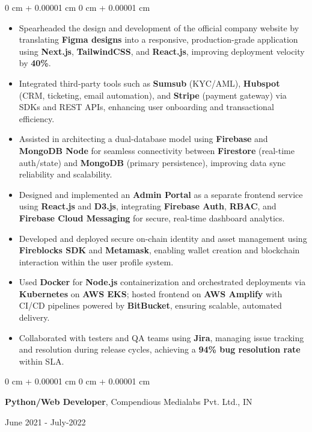 \documentclass[10pt, letterpaper]{article}
\newenvironment{highlights}{
    \begin{itemize}[
        topsep=0.10 cm,
        parsep=0.10 cm,
        partopsep=0pt,
        itemsep=0pt,
        leftmargin=0 cm + 10pt
    ]
}{
    \end{itemize}
} %
\newenvironment{onecolentry}{
    \begin{adjustwidth}{
        0 cm + 0.00001 cm
    }{
        0 cm + 0.00001 cm
    }
}{
    \end{adjustwidth}
} %
\newenvironment{twocolentry}[2][]{
    \onecolentry
    \def\secondColumn{#2}
    \setcolumnwidth{\fill, 4.5 cm}
    \begin{paracol}{2}
}{
    \switchcolumn \raggedleft \secondColumn
    \end{paracol}
    \endonecolentry
} %
\begin{document}
\begin{onecolentry}
\begin{highlights}
	\item Spearheaded the design and development of the official company website by translating \textbf{Figma designs} into a responsive, production-grade application using \textbf{Next.js}, \textbf{TailwindCSS}, and \textbf{React.js}, improving deployment velocity by \textbf{40\%}.
	\item Integrated third-party tools such as \textbf{Sumsub} (KYC/AML), \textbf{Hubspot} (CRM, ticketing, email automation), and \textbf{Stripe} (payment gateway) via SDKs and REST APIs, enhancing user onboarding and transactional efficiency.
	\item Assisted in architecting a dual-database model using \textbf{Firebase} and \textbf{MongoDB Node} for seamless connectivity between \textbf{Firestore} (real-time auth/state) and \textbf{MongoDB} (primary persistence), improving data sync reliability and scalability.
	\item Designed and implemented an \textbf{Admin Portal} as a separate frontend service using \textbf{React.js} and \textbf{D3.js}, integrating \textbf{Firebase Auth}, \textbf{RBAC}, and \textbf{Firebase Cloud Messaging} for secure, real-time dashboard analytics.
	\item Developed and deployed secure on-chain identity and asset management using \textbf{Fireblocks SDK} and \textbf{Metamask}, enabling wallet creation and blockchain interaction within the user profile system.
	\item Used \textbf{Docker} for \textbf{Node.js} containerization and orchestrated deployments via \textbf{Kubernetes} on \textbf{AWS EKS}; hosted frontend on \textbf{AWS Amplify} with CI/CD pipelines powered by \textbf{BitBucket}, ensuring scalable, automated delivery.
	\item Collaborated with testers and QA teams using \textbf{Jira}, managing issue tracking and resolution during release cycles, achieving a \textbf{94\% bug resolution rate} within SLA.
\end{highlights}
\end{onecolentry}






\vspace{0.15 cm}
\begin{twocolentry}{
		June 2021 - July-2022
	}
	\textbf{Python/Web Developer}, Compendious Medialabs Pvt. Ltd., IN
\end{twocolentry}
\end{document}
